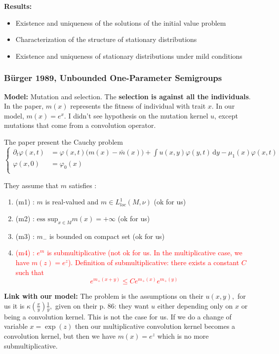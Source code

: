 \documentclass{article}
\newcommand{\diff}{\,\mathrm{d}}
\newcommand{\f}[2]{\frac{#1}{#2}}
\newcommand{\red}[1]{\textcolor{red}{#1}}
\begin{document}
\noindent\textbf{Results:} 
\begin{itemize}
    \item Existence and uniqueness of the solutions of the initial value problem
    \item Characterization of the structure of stationary distributions
    \item Existence and uniqueness of stationary distributions under mild conditions
\end{itemize}

\subsubsection{Bürger 1989, Unbounded One-Parameter Semigroups}
\noindent\textbf{Model:} 
Mutation and selection. The \textbf{selection is against all the individuals}. In the paper, $m(x)$ represents the fitness of individual with trait $x$. In our model, $m(x) = e^x$. I didn't see hypothesis on the mutation kernel $u$, except mutations that come from a convolution operator. 

The paper present the Cauchy problem
\begin{equation*}
    \left\{
        \begin{aligned}
            \partial_t \varphi(x,t) & = \varphi(x,t)\big(m(x)-\bar m(x)\big) + 
    \int u(x,y) \varphi(y,t)\diff y - \mu_1(x)\varphi(x,t) \\
    \varphi(x,0) & = \varphi_0(x)\\
        \end{aligned}
    \right.
\end{equation*}


They assume that $m$ satisfies :
\begin{enumerate}
    \item (m1) : $m$ is real-valued and $m \in L^1_{loc}(M, \nu)$ (ok for us)
    \item (m2) : $\text{ess sup}_{x \in M} m(x) = +\infty$ (ok for us)
    \item (m3) : $m_{-}$ is bounded on compact set (ok for us)
    \item \red{(m4) : $e^m$ is submultiplicative (not ok for us. In the multiplicative case, we have $m(z) = e^{z}$). Definition of submultiplicative: there exists a constant $C$ such that
    \[ 
    e^{m_+(x+y)}\leq C e^{m_+(x)}e^{m_+(y)}\]}
\end{enumerate}\vspace{1em}


\noindent\textbf{Link with our model:} 
The problem is the assumptions on their $u(x,y),$ for us it is $\kappa(\f{x}{y})\f{1}{y},$ given on their p. 86: they want $u$ either depending only on $x$ or being a convolution kernel. This is not the case for us. If we do a change of  variable $x=\exp(z)$ then our multiplicative convolution kernel becomes a convolution kernel, but then we have $m(x)=e^z$ which is no more submultiplicative. \\
\end{document}
